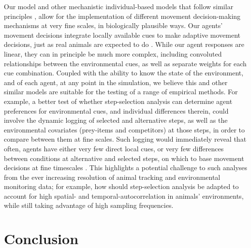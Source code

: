     Our model and other mechanistic individual-based models that follow similar principles \citep{getz2015,getz2016,netz2021}, allow for the implementation of different movement decision-making mechanisms at very fine scales, in biologically plausible ways.
    Our agents' movement decisions integrate locally available cues to make adaptive movement decisions, just as real animals are expected to do \citep{nathan2008a}.
    While our agent responses are linear, they can in principle be much more complex, including convoluted relationships between the environmental cues, as well as separate weights for each cue combination.
    Coupled with the ability to know the state of the environment, and of each agent, at any point in the simulation, we believe this and other similar models are suitable for the testing of a range of empirical methods.
    For example, a better test of whether step-selection analysis can determine agent preferences for environmental cues, and individual differences therein, could involve the dynamic logging of selected and alternative steps, as well as the environmental covariates (prey-items and competitors) at those steps, in order to compare between them at fine scales.
    Such logging would immediately reveal that often, agents have either very few direct local cues, or very few differences between conditions at alternative and selected steps, on which to base movement decisions at fine timescales \cite[relatively clueless regions, per][]{perkins1992}.
    This highlights a potential challenge to such analyses from the ever increasing resolution of animal tracking and environmental monitoring data; for example, how should step-selection analysis be adapted to account for high spatial- and temporal-autocorrelation in animals' environments, while still taking advantage of high sampling frequencies.
    
    \section*{Conclusion}
    
